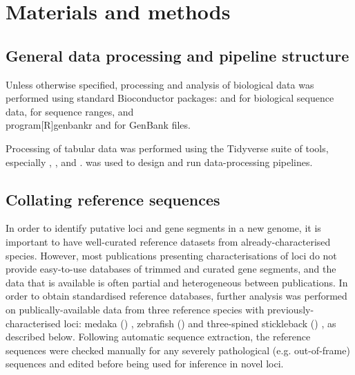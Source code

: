 

\hline

\section{Materials and methods} %

\subsection{General data processing and pipeline structure}

Unless otherwise specified, processing and analysis of biological data was performed using standard Bioconductor \parencite{huber2015bioconductor} packages:  \parencite{pages2017biostrings} and  \parencite{pages2018bsgenome} for biological sequence data,  \parencite{lawrence2013genomicranges} for sequence ranges, and \\program[R]{genbankr} \parencite{becker2018genbankr} and  \parencite{winter2017rentrez} for GenBank files.

Processing of tabular data was performed using the Tidyverse suite of tools, especially  \parencite{wickham2018readr},  \parencite{wickham2018dplyr},  \parencite{wickham2018tidyr} and  \parencite{wickham2018stringr}.  \parencite{koster2012snakemake} was used to design and run data-processing pipelines.

\subsection{Collating reference sequences}

In order to identify putative \igh{} loci and gene segments in a new genome, it is important to have well-curated reference datasets from already-characterised species. However, most publications presenting characterisations of \igh{} loci do not provide easy-to-use databases of trimmed and curated gene segments, and the data that is available is often partial and heterogeneous between publications. In order to obtain standardised reference databases, further analysis was performed on publically-available data from three reference species with previously-characterised \igh{} loci: medaka () \parencite{magadan2011medaka}, zebrafish () \parencite{danilova2005zebrafish} and three-spined stickleback () \parencite{bao2010stickleback,gambondeza2011stickleback}, as described below. Following automatic sequence extraction, the reference sequences were checked manually for any severely pathological (e.g. out-of-frame) sequences and edited before being used for inference in novel loci.

